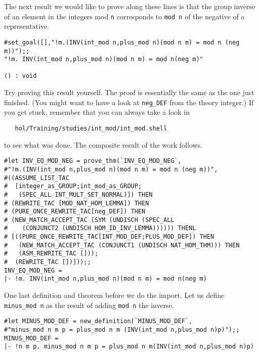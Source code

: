 The next result we would like to prove along these lines is that the
group inverse of an element in the integers mod {\small\tt n} corresponds to
{\small\verb+mod n+} of the negative of a representative.
\begin{session}
\begin{verbatim}
#set_goal([],"!m.(INV(int_mod n,plus_mod n)(mod n m) = mod n (neg m))");;
"!m. INV(int_mod n,plus_mod n)(mod n m) = mod n(neg m)"

() : void
\end{verbatim}
\end{session}

Try proving this result yourself. The proof is essentially the same as
the one just finished.  (You might want to have a look at
{\small\verb+neg_DEF+} from the theory integer.)  If you get stuck,
remember that you can always take a look in
\begin{verbatim}
   hol/Training/studies/int_mod/int_mod.shell
\end{verbatim}
to see what was done.  The composite result of the work follows.
\begin{session}
\begin{verbatim}
#let INV_EQ_MOD_NEG = prove_thm(`INV_EQ_MOD_NEG`,
#"!m.(INV(int_mod n,plus_mod n)(mod n m) = mod n (neg m))",
#((ASSUME_LIST_TAC
#  [integer_as_GROUP;int_mod_as_GROUP;
#   (SPEC_ALL INT_MULT_SET_NORMAL)]) THEN
# (REWRITE_TAC [MOD_NAT_HOM_LEMMA]) THEN
# (PURE_ONCE_REWRITE_TAC[neg_DEF]) THEN
# (NEW_MATCH_ACCEPT_TAC (SYM (UNDISCH (SPEC_ALL
#    (CONJUNCT2 (UNDISCH HOM_ID_INV_LEMMA)))))) THENL
# [((PURE_ONCE_REWRITE_TAC[INT_MOD_DEF;PLUS_MOD_DEF]) THEN
#   (NEW_MATCH_ACCEPT_TAC (CONJUNCT1 (UNDISCH NAT_HOM_THM))) THEN
#   (ASM_REWRITE_TAC []));
#  (REWRITE_TAC [])]));;
INV_EQ_MOD_NEG = 
|- !m. INV(int_mod n,plus_mod n)(mod n m) = mod n(neg m)
\end{verbatim}
\end{session}

One last definition and theorem before we do the import.  Let us
define {\small\verb+minus_mod n+} as the result of adding
{\small\verb+mod n+} the inverse.
\begin{session}
\begin{verbatim}
#let MINUS_MOD_DEF = new_definition(`MINUS_MOD_DEF`,
#"minus_mod n m p = plus_mod n m (INV(int_mod n,plus_mod n)p)");;
MINUS_MOD_DEF = 
|- !n m p. minus_mod n m p = plus_mod n m(INV(int_mod n,plus_mod n)p)
\end{verbatim}
\end{session}

